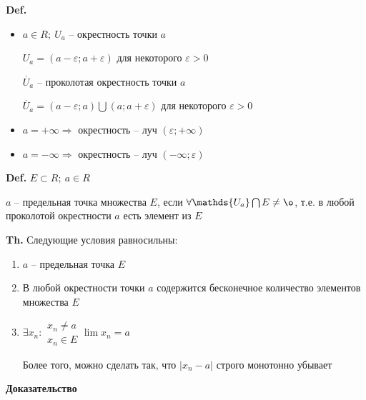 \documentclass[14pt, letter paper]{article}
\begin{document}
\textbf{Def.}

\begin{itemize}
    \item $a \in R;\ U_a$ -- окрестность точки $a$

    $U_a = (a - \varepsilon; a + \varepsilon)$ для некоторого $\varepsilon > 0$

    $\mathring{U_a}$ -- проколотая окрестность точки $a$

    $\mathring{U_a} = (a - \varepsilon; a) \bigcup (a; a + \varepsilon)$ для некоторого $\varepsilon > 0$

    \item $a = + \infty \Rightarrow$ окрестность -- луч $(\varepsilon; + \infty)$

    \item $a = - \infty \Rightarrow$ окрестность -- луч $(- \infty; \varepsilon)$
\end{itemize}

\textbf{Def.} $E \subset R;\ a \in R$

$a$ -- предельная точка множества $E$, если $\forall \mathds{U_a} \bigcap E \neq \o$, т.е. в любой проколотой окрестности $a$ есть элемент из $E$

\vspace{5mm}

\textbf{Th.} Следующие условия равносильны:

\begin{enumerate}
    \item $a$ -- предельная точка $E$
    \item В любой окрестности точки $a$ содержится бесконечное количество элементов множества $E$
    \item $\exists x_n : \begin{gathered}
        x_n \neq a \\
        x_n \in E
    \end{gathered} \lim{x_n} = a$

    Более того, можно сделать так, что $|x_n - a|$ строго монотонно убывает
\end{enumerate}

\begin{center}
    \textbf{Доказательство}
\end{center}
\end{document}
